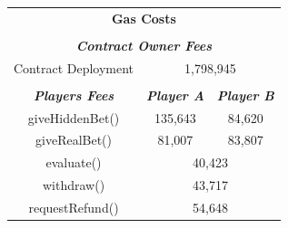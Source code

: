 \documentclass[12pt,a4paper]{article}
\begin{document}
\begin{table}[htpb]
    \begin{center}
        \begin{tabular}{ccc}
        \multicolumn{3}{c}{\textbf{Gas Costs}}                                                                                                                   \\
        \multicolumn{1}{l}{}                                 & \multicolumn{1}{l}{}                            & \multicolumn{1}{l}{}                            \\ \hline
        \multicolumn{3}{|c|}{\textit{\textbf{Contract Owner Fees}}}                                                                                              \\ \hline
        \multicolumn{1}{|c|}{Contract Deployment}            & \multicolumn{2}{c|}{1,798,945}                                                                    \\ \hline
        \multicolumn{1}{l}{}                                 & \multicolumn{1}{l}{}                            & \multicolumn{1}{l}{}                            \\ \hline
        \multicolumn{1}{|c|}{\textit{\textbf{Players Fees}}} & \multicolumn{1}{c|}{\textit{\textbf{Player A}}} & \multicolumn{1}{c|}{\textit{\textbf{Player B}}} \\ \hline
        \multicolumn{1}{|c|}{giveHiddenBet()}                & \multicolumn{1}{c|}{135,643}                    & \multicolumn{1}{c|}{84,620}                     \\ \hline
        \multicolumn{1}{|c|}{giveRealBet()}                  & \multicolumn{1}{c|}{81,007}                     & \multicolumn{1}{c|}{83,807}                     \\ \hline
        \multicolumn{1}{|c|}{evaluate()}                     & \multicolumn{2}{c|}{40,423}                                                                       \\ \hline
        \multicolumn{1}{|c|}{withdraw()}                     & \multicolumn{2}{c|}{43,717}                                                                       \\ \hline
        \multicolumn{1}{|c|}{requestRefund()}                & \multicolumn{2}{c|}{54,648}                                                                       \\ \hline
        \end{tabular}
    \end{center}
\end{table}
\end{document}
